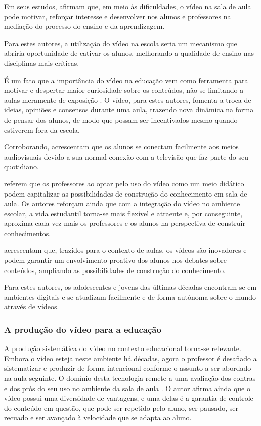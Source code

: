 \documentclass[portuguese]{textolivre}
\begin{document}
Em seus estudos, \textcite{silveira2020} afirmam que, em meio às dificuldades, o vídeo na sala de aula pode motivar, reforçar interesse e desenvolver nos alunos e professores na mediação do processo do ensino e da aprendizagem.

Para estes autores, a utilização do vídeo na escola seria um mecanismo que abriria oportunidade de cativar os alunos, melhorando a qualidade de ensino nas disciplinas mais críticas.

É um fato que a importância do vídeo na educação vem como ferramenta para motivar e despertar maior curiosidade sobre os conteúdos, não se limitando a aulas meramente de exposição \cite{carlsson2013}. O vídeo, para estes autores, fomenta a troca de ideias, opiniões e consensos durante uma aula, trazendo nova dinâmica na forma de pensar dos alunos, de modo que possam ser incentivados mesmo quando estiverem fora da escola.

Corroborando, \textcite{silveira2020} acrescentam que os alunos se conectam facilmente aos meios audiovisuais devido a sua normal conexão com a televisão que faz parte do seu quotidiano.

\textcite{caon2015} referem que os professores ao optar pelo uso do vídeo como um meio didático podem capitalizar as possibilidades de construção do conhecimento em sala de aula. Os autores reforçam ainda que com a integração do vídeo no ambiente escolar, a vida estudantil torna-se mais flexível e atraente e, por conseguinte, aproxima cada vez mais os professores e os alunos na perspectiva de construir conhecimentos.

\textcite{silveira2020} acrescentam que, trazidos para o contexto de aulas, os vídeos são inovadores e podem garantir um envolvimento proativo dos alunos nos debates sobre conteúdos, ampliando as possibilidades de construção do conhecimento.

Para estes autores, os adolescentes e jovens das últimas décadas encontram-se em ambientes digitais e se atualizam facilmente e de forma autônoma sobre o mundo através de vídeos.

\subsubsection{A produção do vídeo para a educação}
A produção sistemática do vídeo no contexto educacional torna-se relevante. Embora o vídeo esteja neste ambiente há décadas, agora o professor é desafiado a sistematizar e produzir de forma intencional conforme o assunto a ser abordado na aula seguinte. O domínio desta tecnologia remete a uma avaliação dos contras e dos prós do seu uso no ambiente da sala de aula \cite{deckert2010}. O autor afirma ainda que o vídeo possui uma diversidade de vantagens, e uma delas é a garantia de controle do conteúdo em questão, que pode ser repetido pelo aluno, ser pausado, ser recuado e ser avançado à velocidade que se adapta ao aluno.
\end{document}

